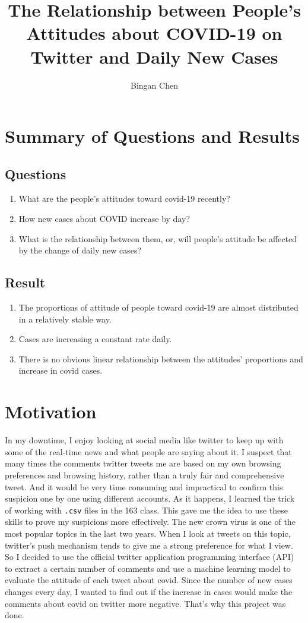 \documentclass[a4paper, 12pt]{article}
\title{The Relationship between People's Attitudes about COVID-19 on Twitter and Daily New Cases}
\author{Bingan Chen}
\begin{document}
\doublespacing

\maketitle

\section*{Summary of Questions and Results}
\subsection*{Questions}
\begin{enumerate}
    \item What are the people's attitudes toward covid-19 recently?
    \item How new cases about COVID increase by day?
    \item What is the relationship between them, or, will people’s attitude be affected by the change of daily new cases?
\end{enumerate}
\subsection*{Result}
\begin{enumerate}
    \item The proportions of attitude of people toward covid-19 are almost distributed in a relatively stable way.
    \item Cases are increasing a constant rate daily.
    \item There is no obvious linear relationship between the attitudes' proportions and increase in covid cases.
\end{enumerate}

\section*{Motivation}
In my downtime, I enjoy looking at social media like twitter to keep up with some of the real-time news and what people are saying about it. I suspect that many times the comments twitter tweets me are based on my own browsing preferences and browsing history, rather than a truly fair and comprehensive tweet. And it would be very time consuming and impractical to confirm this suspicion one by one using different accounts. As it happens, I learned the trick of working with \texttt{.csv} files in the 163 class. This gave me the idea to use these skills to prove my suspicions more effectively. The new crown virus is one of the most popular topics in the last two years. When I look at tweets on this topic, twitter's push mechanism tends to give me a strong preference for what I view. So I decided to use the official twitter application programming interface (API) to extract a certain number of comments and use a machine learning model to evaluate the attitude of each tweet about covid. Since the number of new cases changes every day, I wanted to find out if the increase in cases would make the comments about covid on twitter more negative. That's why this project was done.
\end{document}
